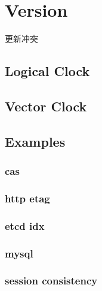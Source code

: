 \chapter{Version}

更新冲突

\section{Logical Clock}

\section{Vector Clock}

\section{Examples}

\subsection{cas}

\subsection{http etag}

\subsection{etcd idx}

\subsection{mysql}

\subsection{session consistency}



